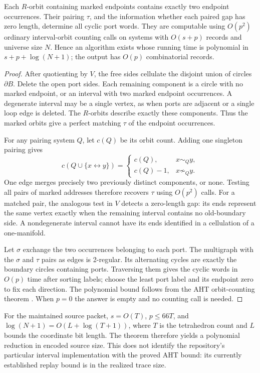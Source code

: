 \begin{theorem}
\label{thm:finite-interface}
Each $R$-orbit containing marked endpoints contains exactly two endpoint
occurrences.  Their pairing $\tau$, and the information whether each paired
gap has zero length, determine all cyclic port words.  They are computable
using $O(p^2)$ ordinary interval-orbit counting calls on systems with
$O(s+p)$ records and universe size $N$.  Hence an algorithm exists whose
running time is polynomial in $s+p+\log(N+1)$; the output has $O(p)$
combinatorial records.
\end{theorem}
\begin{proof}
After quotienting by $V$, the free sides cellulate the disjoint union of
circles $\partial B$.  Delete the open port sides.  Each remaining component
is a circle with no marked endpoint, or an interval with two marked endpoint
occurrences.  A degenerate interval may be a single vertex, as when ports
are adjacent or a single loop edge is deleted.  The $R$-orbits describe
exactly these components.  Thus the marked orbits give a perfect matching
$\tau$ of the endpoint occurrences.

For any pairing system $Q$, let $c(Q)$ be its orbit count.  Adding one
singleton pairing gives
\[
 c(Q\cup\{x\leftrightarrow y\})=
 \begin{cases}c(Q),&x\sim_Qy,\\c(Q)-1,&x\not\sim_Qy.\end{cases}
\]
One edge merges precisely two previously distinct components, or none.
Testing all pairs of marked addresses therefore recovers $\tau$ using
$O(p^2)$ calls.  For a matched pair, the analogous test in $V$ detects a
zero-length gap: its ends represent the same vertex exactly when the
remaining interval contains no old-boundary side.  A nondegenerate interval
cannot have its ends identified in a cellulation of a one-manifold.

Let $\sigma$ exchange the two occurrences belonging to each port.
The multigraph with the $\sigma$ and $\tau$ pairs as edges is 2-regular.
Its alternating cycles are exactly the boundary circles containing ports.
Traversing them gives the cyclic words in $O(p)$ time after sorting labels;
choose the least port label and its endpoint zero to fix each direction.
The polynomial bound follows from the AHT orbit-counting theorem
\cite{aht}.  When $p=0$ the answer is empty and no counting call is needed.
\end{proof}

For the maintained source packet, $s=O(T)$, $p\leq66T$, and
$\log(N+1)=O(L+\log(T+1))$, where $T$ is the tetrahedron count and $L$
bounds the coordinate bit length.  The theorem therefore yields a
polynomial reduction in encoded source size.  This does not identify the
repository's particular interval implementation with the proved AHT bound:
its currently established replay bound is in the realized trace size.


